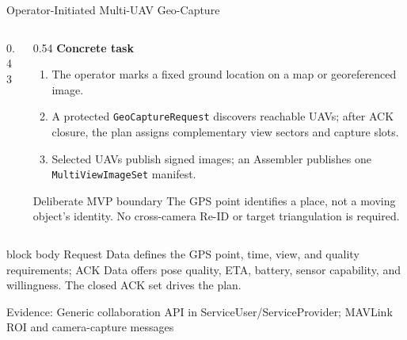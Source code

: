 \documentclass[aspectratio=169]{beamer}
\newcommand{\bluebox}[1]{%
  \begin{beamercolorbox}[rounded=true,shadow=false,sep=0.65em,wd=0.94\linewidth]{block body}
  #1
  \end{beamercolorbox}
}
\newcommand{\evidence}[1]{%
  \vfill\par\noindent
  \begin{minipage}{\linewidth}
  \raggedright{\color{SoftGray}\tiny Evidence: #1}\par
  \end{minipage}
}
\begin{document}
\begin{frame}{Operator-Initiated Multi-UAV Geo-Capture}
\scriptsize
\begin{columns}[T]
\begin{column}{0.43\textwidth}
\begin{center}
\end{center}
\end{column}
\begin{column}{0.54\textwidth}
\textbf{Concrete task}
\begin{enumerate}
  \item The operator marks a fixed ground location on a map or georeferenced image.
  \item A protected \texttt{GeoCaptureRequest} discovers reachable UAVs; after ACK closure, the plan assigns complementary view sectors and capture slots.
  \item Selected UAVs publish signed images; an Assembler publishes one \texttt{MultiViewImageSet} manifest.
\end{enumerate}
\begin{alertblock}{Deliberate MVP boundary}
The GPS point identifies a place, not a moving object's identity. No cross-camera Re-ID or target triangulation is required.
\end{alertblock}
\end{column}
\end{columns}
\vspace{0.18em}
\bluebox{Request Data defines the GPS point, time, view, and quality requirements; ACK Data offers pose quality, ETA, battery, sensor capability, and willingness. The closed ACK set drives the plan.}
\evidence{Generic collaboration API in ServiceUser/ServiceProvider; MAVLink ROI and camera-capture messages}
\end{frame}
\end{document}
